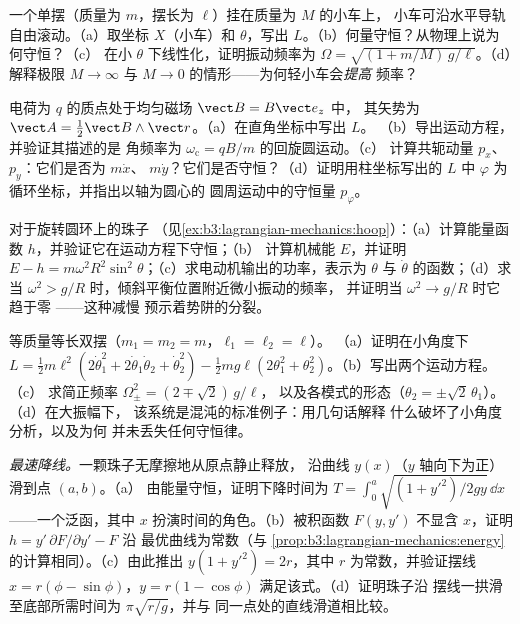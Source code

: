 \begin{exercise}[$\star\star$]\label{exo:b3:lagrangian-mechanics:7}
一个单摆（质量为 $m$，摆长为 $\ell$）挂在质量为 $M$ 的小车上，
小车可沿水平导轨自由滚动。（a）取坐标 $X$（小车）和
$\theta$，写出 $L$。（b）何量守恒？从物理上说为何守恒？（c）
在小 $\theta$ 下线性化，证明振动频率为
$\Omega = \sqrt{(1 + m/M)\,g/\ell}$。（d）解释极限 $M \to
\infty$ 与 $M \to 0$ 的情形——为何轻小车会\emph{提高}
频率？
\end{exercise}

\begin{exercise}[$\star\star$]\label{exo:b3:lagrangian-mechanics:8}
电荷为 $q$ 的质点处于均匀磁场 $\vect B = B\vect e_z$ 中，
其矢势为 $\vect A = \tfrac12\vect B\wedge\vect r$。（a）在直角坐标中写出 $L$。
（b）导出运动方程，并验证其描述的是
角频率为 $\omega_{\text{c}} = qB/m$ 的回旋圆运动。（c）
计算共轭动量 $p_x$、$p_y$：它们是否为 $m\dot x$、
$m\dot y$？它们是否守恒？（d）证明用柱坐标写出的 $L$
中 $\varphi$ 为循环坐标，并指出以轴为圆心的
圆周运动中的守恒量 $p_\varphi$。
\end{exercise}

\begin{exercise}[$\star\star$]\label{exo:b3:lagrangian-mechanics:9}
对于旋转圆环上的珠子
（见\cref{ex:b3:lagrangian-mechanics:hoop}）：（a）计算能量函数
$h$，并验证它在运动方程下守恒；（b）
计算机械能 $E$，并证明 $E - h =
m\omega^2R^2\sin^2\theta$；（c）求电动机输出的功率，表示为
$\theta$ 与 $\dot\theta$ 的函数；（d）求
当 $\omega^2 > g/R$ 时，倾斜平衡位置附近微小振动的频率，
并证明当 $\omega^2 \to g/R$ 时它趋于零 ——这种减慢
预示着势阱的分裂。
\end{exercise}

\begin{exercise}[$\star\star\star$]\label{exo:b3:lagrangian-mechanics:10}
等质量等长双摆（$m_1 = m_2 = m$，$\ell_1 = \ell_2 = \ell$）。
（a）证明在小角度下 $L = \tfrac12 m\ell^2(2\dot\theta_1^2 +
2\dot\theta_1\dot\theta_2 + \dot\theta_2^2) - \tfrac12 mg\ell(2
\theta_1^2 + \theta_2^2)$。（b）写出两个运动方程。（c）
求简正频率 $\Omega_\pm^2 = (2 \mp \sqrt2)\,g/\ell$，
以及各模式的形态（$\theta_2 = \pm\sqrt2\,\theta_1$）。（d）在大振幅下，
该系统是混沌的标准例子：用几句话解释
什么破坏了小角度分析，以及为何
并未丢失任何守恒律。
\end{exercise}

\begin{exercise}[$\star\star\star$]\label{exo:b3:lagrangian-mechanics:11}
\emph{最速降线。}一颗珠子无摩擦地从原点静止释放，
沿曲线 $y(x)$（$y$ 轴向下为正）滑到点 $(a, b)$。（a）
由能量守恒，证明下降时间为 $T =
\int_0^a\sqrt{(1 + y'^2)/2gy}\,\dd x$——一个泛函，其中 $x$
扮演时间的角色。（b）被积函数 $F(y, y')$ 不显含
$x$，证明 $h = y'\,\partial F/\partial y' - F$ 沿
最优曲线为常数（与
\cref{prop:b3:lagrangian-mechanics:energy}的计算相同）。（c）由此推出 $y(1 + y'^2) =
2r$，其中 $r$ 为常数，并验证摆线 $x = r(\phi -
\sin\phi)$，$y = r(1 - \cos\phi)$ 满足该式。（d）证明珠子沿
摆线一拱滑至底部所需时间为 $\pi\sqrt{r/g}$，并与
同一点处的直线滑道相比较。
\end{exercise}


